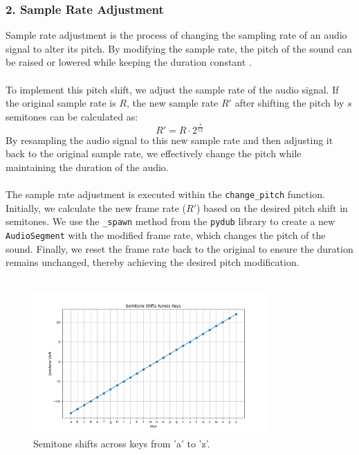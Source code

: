 \subsubsection*{2. Sample Rate Adjustment}

Sample rate adjustment is the process of changing the sampling rate of an audio signal to alter its pitch. By modifying the sample rate, the pitch of the sound can be raised or lowered while keeping the duration constant \cite{jones2003}. \\ \\
\noindent
To implement this pitch shift, we adjust the sample rate of the audio signal. If the original sample rate is \( R \), the new sample rate \( R' \) after shifting the pitch by \( s \) semitones can be calculated as:
\begin{equation}
R' = R \cdot 2^{\frac{s}{12}}
\end{equation}
By resampling the audio signal to this new sample rate and then adjusting it back to the original sample rate, we effectively change the pitch while maintaining the duration of the audio. \\ \\
The sample rate adjustment is executed within the \texttt{change\_pitch} function. Initially, we calculate the new frame rate (\( R' \)) based on the desired pitch shift in semitones. We use the \texttt{\_spawn} method from the \texttt{pydub} library to create a new \texttt{AudioSegment} with the modified frame rate, which changes the pitch of the sound. Finally, we reset the frame rate back to the original to ensure the duration remains unchanged, thereby achieving the desired pitch modification.\\ \\
\noindent
\begin{figure}[h!]
\centering
\includegraphics[width=0.8\textwidth]{Development/semitone_shifts.png}
\caption{Semitone shifts across keys from 'a' to 'z'.}
\end{figure} 





